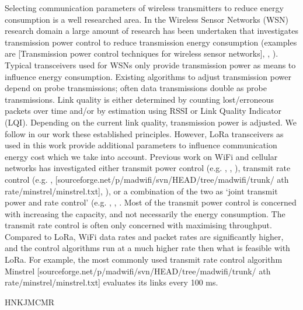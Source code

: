 Selecting communication parameters of wireless transmitters to reduce energy consumption is a well researched area.
In the Wireless Sensor Networks (WSN) research domain a large amount of research has been undertaken that investigates transmission power control to reduce transmission energy consumption (examples are [Transmission power control techniques for wireless sensor networks],
	\cite{lin_atpc_2006},
	\cite{zurita_ares_power_2007}).
Typical transceivers used for WSNs only provide transmission power as means to influence energy consumption.
Existing algorithms to adjust transmission power depend on probe transmissions;
	often data transmissions double as probe transmissions.
Link quality is either determined by counting lost/erroneous packets over time and/or by estimation using RSSI or Link Quality Indicator (LQI).
Depending on the current link quality,
	transmission power is adjusted.
We follow in our work these established principles.
However,
	LoRa transceivers as used in this work provide additional parameters to influence communication energy cost which we take into account.
Previous work on WiFi and cellular networks has investigated either transmit power control (e.g.
\cite{monks_power_2001},
	\cite{muqattash_single-channel_2004},
	\cite{lin_atpc_2006}),
	transmit rate control (e.g.
\cite{lacage_ieee_2004},
	[sourceforge.net/p/madwiﬁ/svn/HEAD/tree/madwiﬁ/trunk/ ath rate/minstrel/minstrel.txt],
	\cite{wong_robust_2006}),
	or a combination of the two as ‘joint transmit power and rate control’ (e.g.
\cite{ramachandran_symphony_2010},
	\cite{subramanian_joint_2005},
	\cite{chevillat_dynamic_2005}.
Most of the transmit power control is concerned with increasing the capacity,
	and not necessarily the energy consumption.
The transmit rate control is often only concerned with maximising throughput.
Compared to LoRa,
	WiFi data rates and packet rates are significantly higher,
	and the control algorithms run at a much higher rate then what is feasible with LoRa.
For example,
	the most commonly used transmit rate control algorithm Minstrel [sourceforge.net/p/madwiﬁ/svn/HEAD/tree/madwiﬁ/trunk/ ath rate/minstrel/minstrel.txt] evaluates its links every 100 ms.

\cite{cuomo_explora_2017} HNKJMCMR

